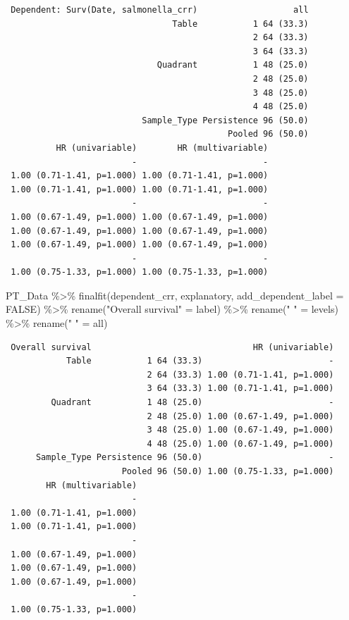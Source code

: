 \documentclass[
  letterpaper,
  DIV=11,
  numbers=noendperiod]{scrartcl}
\newenvironment{Shaded}{}{}
\newcommand{\AttributeTok}[1]{\textcolor[rgb]{0.84,0.23,0.29}{#1}}
\newcommand{\ConstantTok}[1]{\textcolor[rgb]{0.00,0.36,0.77}{#1}}
\newcommand{\FunctionTok}[1]{\textcolor[rgb]{0.44,0.26,0.76}{#1}}
\newcommand{\NormalTok}[1]{\textcolor[rgb]{0.14,0.16,0.18}{#1}}
\newcommand{\OtherTok}[1]{\textcolor[rgb]{0.44,0.26,0.76}{#1}}
\newcommand{\SpecialCharTok}[1]{\textcolor[rgb]{0.00,0.36,0.77}{#1}}
\newcommand{\StringTok}[1]{\textcolor[rgb]{0.01,0.18,0.38}{#1}}
\begin{document}
\begin{verbatim}
 Dependent: Surv(Date, salmonella_crr)                   all
                                 Table           1 64 (33.3)
                                                 2 64 (33.3)
                                                 3 64 (33.3)
                              Quadrant           1 48 (25.0)
                                                 2 48 (25.0)
                                                 3 48 (25.0)
                                                 4 48 (25.0)
                           Sample_Type Persistence 96 (50.0)
                                            Pooled 96 (50.0)
          HR (univariable)        HR (multivariable)
                         -                         -
 1.00 (0.71-1.41, p=1.000) 1.00 (0.71-1.41, p=1.000)
 1.00 (0.71-1.41, p=1.000) 1.00 (0.71-1.41, p=1.000)
                         -                         -
 1.00 (0.67-1.49, p=1.000) 1.00 (0.67-1.49, p=1.000)
 1.00 (0.67-1.49, p=1.000) 1.00 (0.67-1.49, p=1.000)
 1.00 (0.67-1.49, p=1.000) 1.00 (0.67-1.49, p=1.000)
                         -                         -
 1.00 (0.75-1.33, p=1.000) 1.00 (0.75-1.33, p=1.000)
\end{verbatim}

\begin{Shaded}
\begin{Highlighting}[]
\NormalTok{PT\_Data }\SpecialCharTok{\%\textgreater{}\%} 
   \FunctionTok{finalfit}\NormalTok{(dependent\_crr, explanatory, }\AttributeTok{add\_dependent\_label =} \ConstantTok{FALSE}\NormalTok{) }\SpecialCharTok{\%\textgreater{}\%} 
    \FunctionTok{rename}\NormalTok{(}\StringTok{"Overall survival"} \OtherTok{=}\NormalTok{ label) }\SpecialCharTok{\%\textgreater{}\%} 
    \FunctionTok{rename}\NormalTok{(}\StringTok{" "} \OtherTok{=}\NormalTok{ levels) }\SpecialCharTok{\%\textgreater{}\%} 
    \FunctionTok{rename}\NormalTok{(}\StringTok{"  "} \OtherTok{=}\NormalTok{ all) }
\end{Highlighting}
\end{Shaded}

\begin{verbatim}
 Overall survival                                HR (univariable)
            Table           1 64 (33.3)                         -
                            2 64 (33.3) 1.00 (0.71-1.41, p=1.000)
                            3 64 (33.3) 1.00 (0.71-1.41, p=1.000)
         Quadrant           1 48 (25.0)                         -
                            2 48 (25.0) 1.00 (0.67-1.49, p=1.000)
                            3 48 (25.0) 1.00 (0.67-1.49, p=1.000)
                            4 48 (25.0) 1.00 (0.67-1.49, p=1.000)
      Sample_Type Persistence 96 (50.0)                         -
                       Pooled 96 (50.0) 1.00 (0.75-1.33, p=1.000)
        HR (multivariable)
                         -
 1.00 (0.71-1.41, p=1.000)
 1.00 (0.71-1.41, p=1.000)
                         -
 1.00 (0.67-1.49, p=1.000)
 1.00 (0.67-1.49, p=1.000)
 1.00 (0.67-1.49, p=1.000)
                         -
 1.00 (0.75-1.33, p=1.000)
\end{verbatim}
\end{document}
